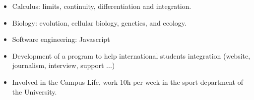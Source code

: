 \begin{minipage}{.9\textwidth}
    \raggedright
    \begin{minipage}[t]{.30\textwidth}
        \begin{itemize}
            \item Calculus: limits, continuity, differentiation and integration.
            \item Biology: evolution, cellular biology, genetics, and ecology.
            \item Software engineering: Javascript
        \end{itemize}
    \end{minipage}
    \begin{minipage}[t]{.30\textwidth}
        \begin{itemize}
            \item Development of a program to help international students integration (website, journalism, interview, support ...)
            \item Involved in the Campus Life, work 10h per week in the sport department of the University.
        \end{itemize}
    \end{minipage}
\end{minipage}
